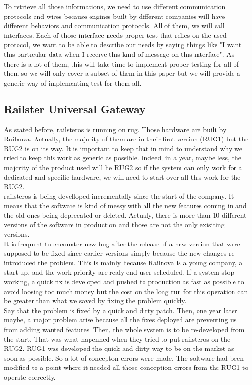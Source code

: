\documentclass[12pt]{article}
\begin{document}
To retrieve all those informations, we need to use different communication protocols and wires because engines built by different companies will have different behaviors and communication protocols. All of them, we will call interfaces. Each of those interface needs proper test that relies on the used protocol, we want to be able to describe our needs by saying things like "I want this particular data when I receive this kind of message on this interface". As there is a lot of them, this will take time to implement proper testing for all of them so we will only cover a subset of them in this paper but we will provide a generic way of implementing test for them all.

\subsection{Railster Universal Gateway}

As stated before, \gls{railsteros} is running on \gls{rug}. Those hardware are built by Railnova. Actually, the majority of them are in their first version (RUG1) but the RUG2 is on its way. It is important to keep that in mind to understand why we tried to keep this work as generic as possible. Indeed, in a year, maybe less, the majority of the product used will be RUG2 so if the system can only work for a dedicated and specific hardware, we will need to start over all this work for the RUG2.\\

\gls{railsteros} is being develloped incrementally since the start of the company. It means that the software is kind of messy with all the new features coming in and the old ones being deprecated or deleted. Actualy, there is more than 10 different versions of the software in production and those are not the only exisiting versions.\\

It is frequent to encounter new bug after the release of a new version that were supposed to be fixed since earlier versions simply because the new changes re-introduced the problem. This is mainly because Railnova is a young company, a start-up, and the work priority are realy end-user scheduled. If a system stop working, a quick fix is developed and pushed to production as fast as possible to avoid loosing too much money but the cost on the long run for this operation can be greater than what we saved by fixing the problem quickly.\\

Say that the problem is fixed by a quick and dirty patch. Then, one year later maybe, a major problem arise because all the fixes deployed are preventing us from adding wanted features. Then, the whole system is to be re-developed from the start. That was what hapenned when they tried to put \gls{railsteros} on the RUG2. RUG1 was developed the quick and dirty way to be on the market as soon as possible. So a lot of concepton errors were made. The software had been modified to a point where it needed all those conception errors from the RUG1 to operate correctly.\\
\end{document}
